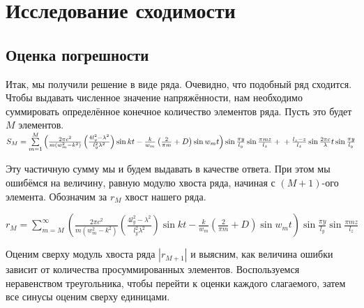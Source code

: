 \chapter{Исследование сходимости}
\section{Оценка погрешности}

Итак, мы получили решение в виде ряда. Очевидно, что подобный ряд сходится. Чтобы выдавать численное значение напряжённости, нам необходимо суммировать определённое конечное количество элементов ряда. Пусть это будет $M$ элементов.
$S_M = \sum \limits_{m=1}^{M} \left( \frac{2\pi c^2}{m(w_m^2 - k^2)}\left(\frac{4l_y^2 - \lambda^2}{l_y^2\lambda^2} \right)\sin{kt} - \frac{k}{w_m}\left(\frac{2}{\pi m} + D\right)\sin{w_mt} \right) \sin\frac{\pi y}{l_y} \sin\frac{\pi m z}{l_z} + \\
    + \frac{l_z - z}{l_z} \sin\frac{2\pi c}{\lambda}t \sin\frac{\pi y}{l_y}$

Эту частичную сумму мы и будем выдавать в качестве ответа. При этом мы ошибёмся на величину, равную модулю хвоста ряда, начиная с $(M+1)$-ого элемента. Обозначим за $r_M$ хвост нашего ряда.

$r_M = \sum \limits_{m=M}^{\infty} \left( \frac{2\pi c^2}{m(w_m^2 - k^2)}\left(\frac{4l_y^2 - \lambda^2}{l_y^2\lambda^2} \right)\sin{kt} - \frac{k}{w_m}\left(\frac{2}{\pi m} + D\right)\sin{w_mt} \right) \sin\frac{\pi y}{l_y} \sin\frac{\pi m z}{l_z}$

Оценим сверху модуль хвоста ряда $|r_{M+1}|$ и выясним, как величина ошибки зависит от количества просуммированных элементов. Воспользуемся неравенством треугольника, чтобы перейти к оценки каждого слагаемого, затем все синусы оценим сверху единицами.

